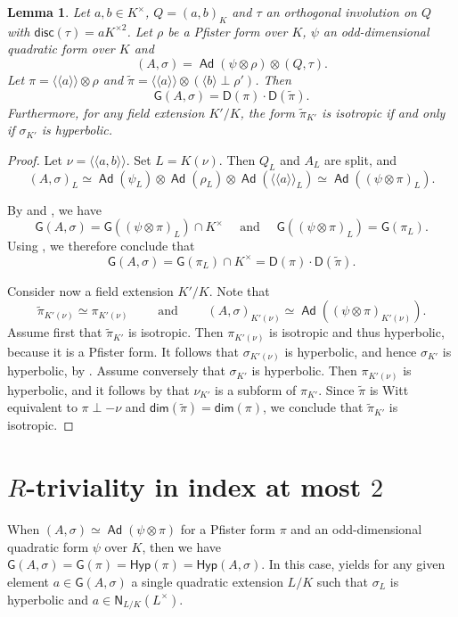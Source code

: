\documentclass[twoside,11pt]{amsart}
\numberwithin{equation}{section}
\newtheorem{lem}[equation]{Lemma}
\theoremstyle{definition}
\renewcommand{\dim}{\mathsf{dim}}
\newcommand{\mg}[1]{{#1}^{\times}}
\newcommand{\sq}[1]{{#1}^{\times 2}}
\newcommand{\s}{\sigma}
\newcommand{\la}{\langle}
\newcommand{\ra}{\rangle}
\newcommand{\lla}{\la\!\la}
\newcommand{\rra}{\ra\!\ra}
\newcommand\Ad{\operatorname{\mathsf{Ad}}}
\newcommand{\N}{\mathsf{N}}
\newcommand{\disc}{\mathsf{disc}}
\newcommand{\G}{\mathsf{G}}
\newcommand{\Hyp}{\mathsf{Hyp}}
\newcommand{\D}{\mathsf{D}}
\newcommand{\wt}{\widetilde}
\begin{document}
\begin{lem}\label{ad}
Let $a,b\in\mg{K}$, $Q=(a,b)_K$ and $\tau$ an orthogonal involution on $Q$ with $\disc(\tau)=a\sq{K}$.
Let $\rho$ be a Pfister form over $K$, $\psi$ an odd-dimensional quadratic form over $K$ and $$(A,\s)=\Ad(\psi\otimes\rho)\otimes (Q,\tau).$$
Let $\pi=\lla a\rra\otimes \rho$ and $\wt{\pi}=\lla a\rra\otimes (\la b\ra\perp\rho')$.
Then $$\G(A,\s)=\D(\pi)\cdot \D(\wt{\pi}).$$
    Furthermore, for any field extension $K'/K$, the form $\wt{\pi}_{K'}$ is isotropic if and only if $\s_{K'}$ is hyperbolic.
    \end{lem}
\begin{proof}
Let $\nu= \lla a,b\rra$. Set $L=K(\nu)$.
Then $Q_{L}$ and $A_{L}$ are split, and 
\[(A,\s)_{L}\simeq \Ad(\psi_L)\otimes\Ad(\rho_{L})\otimes\Ad(\lla a\rra_{L})\simeq \Ad((\psi\otimes\pi)_{L}).\]

By  and , we have
\[\G(A,\s)=\G((\psi\otimes \pi)_L)\cap \mg{K}\quad\text{ and 
}\quad\G((\psi\otimes\pi)_{L})=\G(\pi_{L}).\]
Using , we therefore conclude that 
\[\G(A,\s)=\G(\pi_{L})\cap\mg{K}=\D(\pi)\cdot \D(\wt{\pi}).\]

Consider now a field extension $K'/K$.
Note that 
\[\wt{\pi}_{K'(\nu)}\simeq \pi_{K'(\nu)}\qquad\text{ and }\qquad(A,\s)_{K'(\nu)}\simeq \Ad((\psi\otimes\pi)_{K'(\nu)}).\]
Assume first that $\wt{\pi}_{K'}$ is isotropic.
Then $\pi_{K'(\nu)}$ is isotropic and thus hyperbolic, because it is a Pfister form. 
It follows that $\s_{K'(\nu)}$ is hyperbolic, and hence $\s_{K'}$ is hyperbolic, by .
Assume conversely that $\s_{K'}$ is hyperbolic.
Then $\pi_{K'(\nu)}$ is hyperbolic, and it follows by  that $\nu_{K'}$ is a subform of $\pi_{K'}$.
Since $\wt{\pi}$ is Witt equivalent to $\pi\perp-\nu$ and $\dim(\wt{\pi})=\dim(\pi)$, we conclude that $\wt{\pi}_{K'}$ is isotropic.
\end{proof}

\section{\texorpdfstring{$R$-triviality in index at most $2$}{R-triviality in index at most 2}}
\label{S:main-result}

When $(A,\sigma) \simeq \Ad(\psi \otimes \pi)$ for a Pfister form $\pi$ and an odd-dimensional quadratic form $\psi$ over $K$, then we have $\G(A,\sigma) = \G(\pi) = \Hyp(\pi) = \Hyp(A,\sigma)$. In this case,  yields for any given element $a \in \G(A,\sigma)$ a single quadratic extension $L/K$ such that $\sigma_L$ is hyperbolic and $a \in \N_{L/K}(\mg{L})$.
\end{document}
